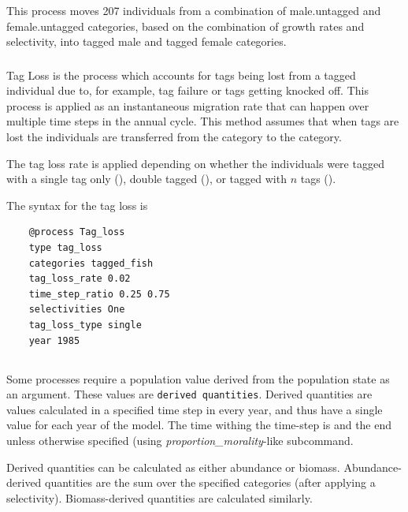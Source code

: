 This process moves 207 individuals from a combination of male.untagged and female.untagged categories, based on the combination of growth rates and selectivity, into tagged male and tagged female categories.

\subsubsection{}

Tag Loss is the process which accounts for tags being lost from a tagged individual due to, for example, tag failure or tags getting knocked off. This process is applied as an instantaneous migration rate that can happen over multiple time steps in the annual cycle. This method assumes that when tags are lost the individuals are transferred from the  category to the  category.

The tag loss rate is applied depending on whether the individuals were tagged with a single tag only (), double tagged (), or tagged with $n$ tags ().

The syntax for the tag loss is

{\small{\begin{verbatim}
	@process Tag_loss
	type tag_loss
	categories tagged_fish
	tag_loss_rate 0.02
	time_step_ratio 0.25 0.75
	selectivities One
	tag_loss_type single
	year 1985
		\end{verbatim}}}

\subsection{\label{sec:derived-quantities}}

Some processes require a population value derived from the population state as an argument. These values are \texttt{derived quantities}. Derived quantities are values calculated in a specified time step in every year, and thus have a single value for each year of the model. The time withing the time-step is and the end unless otherwise specified (using \textit{proportion\_morality}-like subcommand.

Derived quantities can be calculated as either abundance or biomass. Abundance-derived quantities are the sum over the specified categories (after applying a selectivity). Biomass-derived quantities are calculated similarly. 


